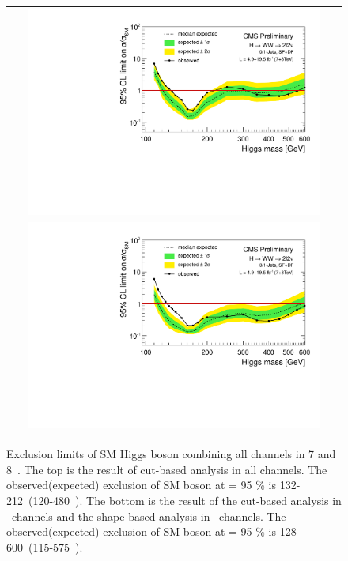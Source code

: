 \begin{figure}[htp] 
\centering 
\begin{tabular}{c} 
\includegraphics[width=0.9\textwidth]{figures/table_limits_nj_cut_78TeV_log.pdf} \\
\includegraphics[width=0.9\textwidth]{figures/table_limits_nj_78TeV_log.pdf} 
\end{tabular} 
\caption{Exclusion limits of SM Higgs boson combining all channels in 7 and 8~\TeV. 
The top is the result of cut-based analysis in all channels.
The observed(expected) exclusion of SM boson at \CLs = 95 \% is 132-212~\GeV(120-480~\GeV). 
The bottom is the result of the cut-based analysis in \SF\ channels 
and the shape-based analysis in \DF\ channels.
The observed(expected) exclusion of SM boson at \CLs = 95 \% is 128-600~\GeV(115-575~\GeV).} 
\label{fig:limit78} 
\end{figure} 

